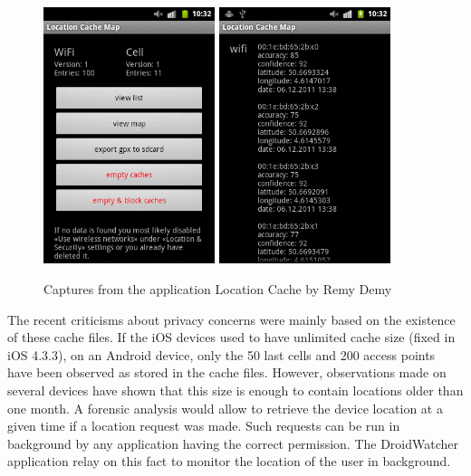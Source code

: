 \begin{figure}[h]
  \centering
  \includegraphics[width=5cm]{images/cache1.png}
  \includegraphics[width=5cm]{images/cache2.png}
  \caption{Captures from the application Location Cache by Remy Demy}
  \label{fig:locmap}
\end{figure}

The recent criticisms about privacy concerns were mainly based on the existence of these cache files.
If the iOS devices used to have unlimited cache size (fixed in iOS 4.3.3), on an Android device, only the 50 last cells and 200 access points have been observed as stored in the cache files.
However, observations made on several devices have shown that this size is enough to contain locations older than one month.
A forensic analysis would allow to retrieve the device location at a given time if a location request was made.
Such requests can be run in background by any application having the correct permission.
The DroidWatcher application relay on this fact to monitor the location of the user in background.\\

